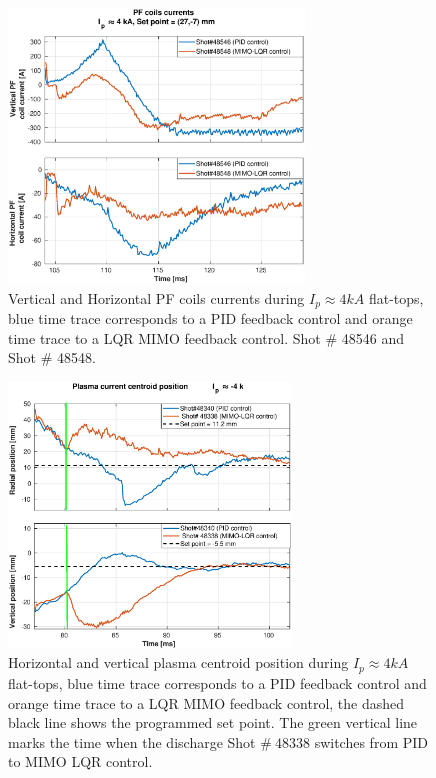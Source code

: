 \begin{figure}
	\centering
	\includegraphics[width=0.7\textwidth]{Chp5/PIDvsMIMO_546_548_curr_2.eps}
	\caption{ Vertical and Horizontal PF coils currents during  $I_p\approx 4kA$  flat-tops, blue time trace corresponds to a PID feedback control and orange time trace to a LQR MIMO feedback control.  Shot $\#$ 48546 and Shot $\#$ 48548.}
\end{figure}

\begin{figure}
	\centering
	\includegraphics[width=0.67\textwidth]{Chp5/PIDvsMIMO_340_338_2.eps}
	\caption{Horizontal and vertical plasma centroid position during  $I_p\approx 4kA$  flat-tops, blue time trace corresponds to a PID feedback control and orange time trace to a LQR MIMO feedback control, the dashed black line shows the programmed set point. The green vertical line marks the time  when the  discharge Shot $\# ~48338$ switches  from PID to MIMO LQR control.	}
\end{figure}

